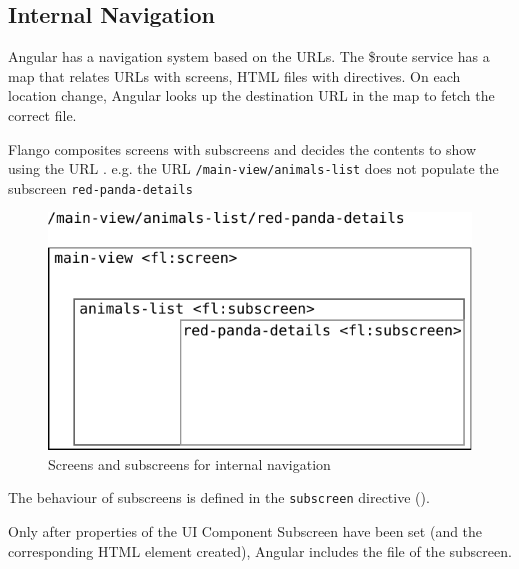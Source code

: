\subsection{Internal Navigation}
Angular has a navigation system based on the \acp{URL}.
The \$route service has a map that relates \acp{URL} with screens, \ac{HTML} files with directives.
On each location change, Angular looks up the destination \ac{URL} in the map to fetch the correct file.

Flango \cm composites screens with subscreens and decides the contents to show using the \ac{URL} .
e.g. the \ac{URL} \texttt{/main-view/animals-list} does not populate the subscreen \texttt{red-panda-details}

\begin{figure}[htb]
    \centering
    \includegraphics{figures/design/internal-navigation.pdf}
    \caption{Screens and subscreens for internal navigation}
    \label{fig:design-internal-navigation}
\end{figure}

The behaviour of subscreens is defined in the \texttt{subscreen} directive ().

Only after properties of the UI Component Subscreen have been set (and the corresponding \ac{HTML} element created), Angular includes the file of the subscreen.

